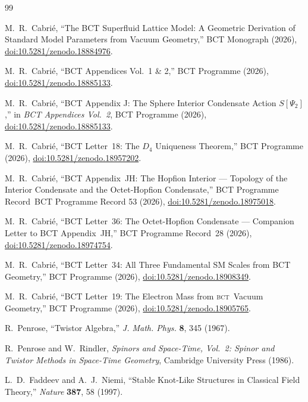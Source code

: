 \documentclass[aps,prl,preprint,superscriptaddress,floatfix]{revtex4-2}
\newcommand{\BCT}{\textsc{bct}}
\begin{document}
\begin{thebibliography}{99}

M.~R.~Cabri\'{e},
``The BCT Superfluid Lattice Model: A Geometric Derivation of Standard
Model Parameters from Vacuum Geometry,''
BCT Monograph (2026),
\href{https://doi.org/10.5281/zenodo.18884976}{doi:10.5281/zenodo.18884976}.

M.~R.~Cabri\'{e},
``BCT Appendices Vol.~1 \& 2,''
BCT Programme (2026),
\href{https://doi.org/10.5281/zenodo.18885133}{doi:10.5281/zenodo.18885133}.

M.~R.~Cabri\'{e},
``BCT Appendix J: The Sphere Interior Condensate Action $S[\Psi_2]$,''
in \textit{BCT Appendices Vol.~2}, BCT Programme (2026),
\href{https://doi.org/10.5281/zenodo.18885133}{doi:10.5281/zenodo.18885133}.

M.~R.~Cabri\'{e},
``BCT Letter~18: The $D_4$ Uniqueness Theorem,''
BCT Programme (2026),
\href{https://doi.org/10.5281/zenodo.18957202}{doi:10.5281/zenodo.18957202}.

M.~R.~Cabri\'{e},
``BCT Appendix~JH: The Hopfion Interior ---
Topology of the Interior Condensate and the Octet-Hopfion Condensate,''
BCT Programme Record~BCT Programme Record 53 (2026),
\href{https://doi.org/10.5281/zenodo.18975018}{doi:10.5281/zenodo.18975018}.

M.~R.~Cabri\'{e},
``BCT Letter~36: The Octet-Hopfion Condensate ---
Companion Letter to BCT Appendix~JH,''
BCT Programme Record~28 (2026),
\href{https://doi.org/10.5281/zenodo.18974754}{doi:10.5281/zenodo.18974754}.

M.~R.~Cabri\'{e},
``BCT Letter~34: All Three Fundamental SM Scales from BCT Geometry,''
BCT Programme (2026),
\href{https://doi.org/10.5281/zenodo.18908349}{doi:10.5281/zenodo.18908349}.

M.~R.~Cabri\'{e},
``BCT Letter~19: The Electron Mass from \BCT\ Vacuum Geometry,''
BCT Programme (2026),
\href{https://doi.org/10.5281/zenodo.18905765}{doi:10.5281/zenodo.18905765}.

R.~Penrose,
``Twistor Algebra,''
\textit{J. Math. Phys.} \textbf{8}, 345 (1967).

R.~Penrose and W.~Rindler,
\textit{Spinors and Space-Time, Vol.~2: Spinor and Twistor Methods in
Space-Time Geometry},
Cambridge University Press (1986).

L.~D.~Faddeev and A.~J.~Niemi,
``Stable Knot-Like Structures in Classical Field Theory,''
\textit{Nature} \textbf{387}, 58 (1997).


\end{thebibliography}
\end{document}
